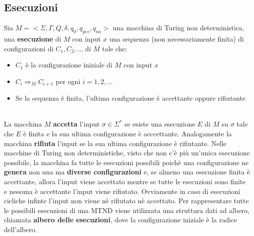\subsection{Esecuzioni}
\colorbox{SALZO}{\parbox{\dimexpr\linewidth-2\fboxsep}{\begin{definition}
   Sia $M = < \Sigma, \Gamma,Q,\delta,q_0,q_{yes},q_{no}>$ una macchina di Turing non deterministica, una \textbf{esecuzione} di $M$ con input $x$ una sequenza (non necessariamente finita) di configurazioni di $C_1,C_2,...$ di $M$
   tale che:
   \begin{itemize}
    \item $C_1$ è la configurazione iniziale di $M$ con input $x$
    \item $C_i \Rightarrow_M C_{i+1}$ per ogni $i = 1,2,...$
    \item Se la sequenza è finita, l'ultima configurazione è accettante oppure rifiutante
   \end{itemize}
\end{definition}}}\smallskip\\
La macchina $M$ \textbf{accetta} l'input $\sigma \in \Sigma^*$ se esiste una esecuzione $E$ di $M$ su $\sigma$ tale che $E$ è finita e la sua ultima configurazione è acccettante.
Analogamente la macchina \textbf{rifiuta} l'input se la sua ultima configurazione è rifiutante. Nelle macchine di Turing non deterministiche, visto che non c'è più un'unica esecuzione possibile, la macchina fa tutte le esecuzioni
possibili poichè una configurazione ne \textbf{genera} non una ma \textbf{diverse configurazioni} e, se almeno una esecuzione finita è accettante, allora l'input viene accettato mentre se tutte le esecuzioni sono finite e nessuna è accettante l'input viene rifiutato. Ovviamente in caso di esecuzioni cicliche infinte 
l'input non viene nè rifiutato nè accettato. Per rappresentare tutte le possibili esecuzioni di una MTND viene utilizzata una struttura dati ad albero, chiamata \textbf{albero delle esecuzioni}, dove la configurazione
iniziale è la radice dell'albero.



